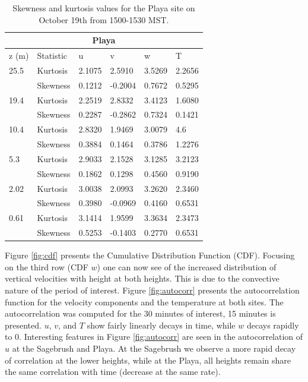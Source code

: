 \documentclass[]{article}
\begin{document}
\begin{table}
\begin{tabular}{ |p{1cm}|p{1.5cm}|p{1cm}|p{1.25cm}|p{1cm}| p{1.25cm}|}
	\hline
	\multicolumn{6}{|c|}{Playa} \\
	\hline\hline
	z (m) & Statistic & u &  v & w & T\\
	\hline
	25.5 & Kurtosis & 2.1075 & 2.5910 & 3.5269 &  2.2656\\
	&Skewness & 0.1212 & -0.2004 & 0.7672 & 0.5295\\
	\hline
	19.4 & Kurtosis & 2.2519 & 2.8332 & 3.4123 &1.6080 \\
	&Skewness & 0.2287 & -0.2862 & 0.7324 & 0.1421\\
	\hline
	10.4 & Kurtosis & 2.8320 & 1.9469 & 3.0079 &4.6 \\
	&Skewness & 0.3884 & 0.1464 & 0.3786 &1.2276\\
	\hline
	5.3 & Kurtosis & 2.9033 & 2.1528  & 3.1285 & 3.2123  \\
	&Skewness & 0.1862 & 0.1298 & 0.4560 & 0.9190\\
	\hline
	2.02 & Kurtosis &\cellcolor{red!25} 3.0038 & 2.0993 & 3.2620  & 2.3460\\
	&Skewness & \cellcolor{blue!25} 0.3980 & -0.0969 & 0.4160 & 0.6531\\
	\hline
	0.61 & Kurtosis & \cellcolor{red!25} 3.1414 & 1.9599 & 3.3634  & 2.3473\\
	&Skewness & \cellcolor{blue!25} 0.5253 & -0.1403 & 0.2770 &0.6531\\
	\hline
\end{tabular}
\label{tab:kurt_playa}
\caption{Skewness and kurtosis values for the Playa site on October 19th from 1500-1530 MST. }
\end{table}
Figure \ref{fig:cdf} presents the Cumulative Distribution Function (CDF). Focusing on the third row (CDF $w$) one can now see of the increased distribution of vertical velocities with height at both heights. This is due to the convective nature of the period of interest. Figure \ref{fig:autocorr} presents the autocorrelation function for the velocity components and the temperature at both sites. The autocorrelation was computed for the 30 minutes of interest, 15 minutes is presented. $u$, $v$, and $T$ show fairly linearly decays in time, while $w$ decays rapidly to 0. Interesting features in Figure \ref{fig:autocorr} are seen in the autocorrelation of $u$ at the Sagebrush and Playa. At the Sagebrush we observe a more rapid decay of correlation at the lower heights, while at the Playa, all heights remain share the same correlation with time (decrease at the same rate). 
\end{document}
